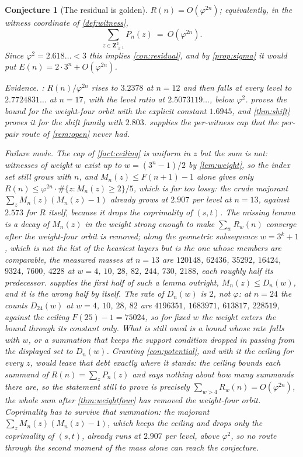 \documentclass[11pt]{amsart}
\newtheorem{conjecture}[theorem]{Conjecture}
\theoremstyle{definition}
\theoremstyle{remark}
\begin{document}
\begin{conjecture}[The residual is golden]
\label{con:witness}
$R(n)=O(\varphi^{2n})$; equivalently, in the witness coordinate of \cref{def:witness},
\[
\sum_{z\in\mathbf{Z}_{\ge 1}^2}P_n(z)\ =\ O(\varphi^{2n}) .
\]
Since $\varphi^2=2.618\ldots<3$ this implies \cref{con:residual}, and by \cref{prop:sigma} it would put $E(n)=2\cdot 3^n+O(\varphi^{2n})$.
\smallskip

\noindent\emph{Evidence.} : $R(n)/\varphi^{2n}$ rises to $3.2378$ at $n=12$ and then falls at every level to $2.7724831\ldots$ at $n=17$, with the level ratio at $2.5073119\ldots$, below $\varphi^2$.  proves the bound for the weight-four orbit with the explicit constant $1.6945$, and \cref{thm:shift} proves it for the shift family with $2.803$.  supplies the per-witness cap that the per-pair route of \cref{rem:open} never had.
\smallskip

\noindent\emph{Failure mode.} The cap of \cref{fact:ceiling} is uniform in $z$ but the sum is not: witnesses of weight $w$ exist up to $w=(3^n-1)/2$ by \cref{lem:weight}, so the index set still grows with $n$, and $M_n(z)\le F(n+1)-1$ alone gives only $R(n)\le\varphi^{2n}\cdot\#\{z:M_n(z)\ge 2\}/5$, which is far too lossy: the crude majorant $\sum_z M_n(z)(M_n(z)-1)$ already grows at $2.907$ per level at $n=13$, against $2.573$ for $R$ itself, because it drops the coprimality of $(s,t)$. The missing lemma is a decay of $M_n(z)$ in the weight strong enough to make $\sum_{w}R_w(n)$ converge after the weight-four orbit is removed; along the geometric subsequence $w=3^k+1$, which is not the list of the heaviest layers but is the one whose members are comparable, the measured masses at $n=13$ are $120148$, $62436$, $35292$, $16424$, $9324$, $7600$, $4228$ at $w=4$, $10$, $28$, $82$, $244$, $730$, $2188$, each roughly half its predecessor.  supplies the first half of such a lemma outright, $M_n(z)\le D_n(w)$, and it is the wrong half by itself. The rate of $D_n(w)$ is $2$, not $\varphi$: at $n=24$ the counts $D_{24}(w)$ at $w=4$, $10$, $28$, $82$ are $4196351$, $1683971$, $613817$, $228519$, against the ceiling $F(25)-1=75024$, so for fixed $w$ the weight enters the bound through its constant only. What is still owed is a bound whose rate falls with $w$, or a summation that keeps the support condition dropped in passing from the displayed set to $D_n(w)$. Granting \cref{con:potential}, and with it the ceiling for every $z$, would leave that debt exactly where it stands: the ceiling bounds each summand of $R(n)=\sum_zP_n(z)$ and says nothing about how many summands there are, so the statement still to prove is precisely $\sum_{w>4}R_w(n)=O(\varphi^{2n})$, the whole sum after \cref{thm:weightfour} has removed the weight-four orbit. Coprimality has to survive that summation: the majorant $\sum_zM_n(z)(M_n(z)-1)$, which keeps the ceiling and drops only the coprimality of $(s,t)$, already runs at $2.907$ per level, above $\varphi^2$, so no route through the second moment of the mass alone can reach the conjecture.
\end{conjecture}
\end{document}
